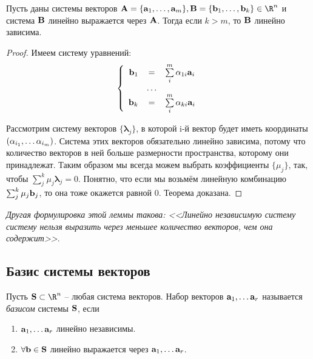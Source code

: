 \begin{theorem}
  \label{mainlemma}
  Пусть даны системы векторов $\Ab=\{\ab_1,\dots,\ab_m\},\Bb=\{\bb_1,\dots,\bb_k\}\in\R^n$ и система $\mathbf{B}$ линейно выражается через $\mathbf{A}$. Тогда если $k>m$, то $\mathbf{B}$ линейно зависима.
\end{theorem}
\begin{proof}
  Имеем систему уравнений:
  $$
   \left\{
    \begin{array}{rcl}
      \mathbf{b}_1 &   =   & \sum\limits_i^m\alpha_{1i}\mathbf{a}_i\\
          & \dots & \\
      \mathbf{b}_k &   =   & \sum\limits_i^m\alpha_{ki}\mathbf{a}_i\\
    \end{array}
   \right.
  $$
  
  Рассмотрим систему векторов $\{\mathbf\lambda_j\}$, в которой i-й вектор будет иметь координаты $(\alpha_{i_1},\dots\alpha_{i_m})$. Система этих векторов обязательно линейно зависима, потому что количество векторов в ней больше размерности пространства, которому они принадлежат. Таким образом мы всегда можем выбрать коэффициенты $\{ \mu_j \}$, так, чтобы $\sum_j^k \mu_j\mathbf\lambda_j = 0$. Понятно, что если мы возьмём линейную комбинацию $\sum_j^k \mu_j \mathbf{b}_j$, то она тоже окажется равной 0. Теорема доказана.
\end{proof}
\begin{note}
  \emph{Другая формулировка этой леммы такова: <<Линейно независимую систему систему нельзя выразить через меньшее количество векторов, чем она содержит>>}.
\end{note}

\subsection{Базис системы векторов}

\begin{df}
  Пусть $\Sb\subset\R^n$ -- любая система векторов. Набор векторов $\mathbf{a}_1,\dots \mathbf{a}_r$ называется \emph{базисом} системы $\mathbf{S}$, если
  \begin{enumerate}
    \item $\mathbf{a}_1,\dots \mathbf{a}_r$ линейно независимы.
    \item $\forall \mathbf{b}\in\mathbf{S}$ линейно выражается через $\mathbf{a}_1,\dots \mathbf{a}_r$.
  \end{enumerate}
\end{df}

